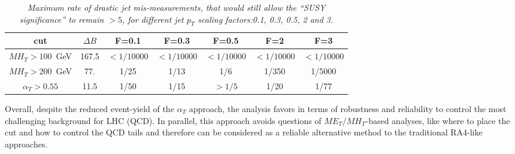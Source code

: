 \begin{table}[h!]
\vspace{5mm}
\small
   \centering
   \begin{tabular}{|c||c|c|c|c|c|c|}
      \hline
cut & $\Delta B$ & F=0.1 & F=0.3 & F=0.5 & F=2 & F=3 \\ \hline \hline
$MH_{T}>100$~GeV & 167.5 & $<1/10000$ & $<1/10000$ & $<1/10000$ & $<1/10000$ & $<1/10000$ \\
$MH_{T}>200$~GeV & 77. & 1/25 & 1/13 & 1/6 & 1/350 & 1/5000 \\
$\alpha_{T}>0.55$ & 11.5 & 1/50 & 1/15 & $> 1/5$ & 1/20 & 1/77 \\ \hline

   \end{tabular}
   \caption{\textit{Maximum rate of drastic jet mis-measurements, that would still allow the ``SUSY significance'' to remain $>5$, for different jet $p_{T}$ scaling factors:0.1, 0.3, 0.5, 2 and 3. }}
   \vspace{5mm}
\label{tab:scale5}
\end{table}	

Overall, despite the reduced event-yield of the $\alpha_{T}$ approach, the analysis favors in terms of robustness and reliability to control the most challenging background for LHC (QCD). In parallel, this approach avoids questions of $ME_{T}/MH_{T}$-based analyses, like where to place the cut and how to control the QCD tails and therefore can be considered as a reliable alternative method to the traditional RA4-like approaches.



